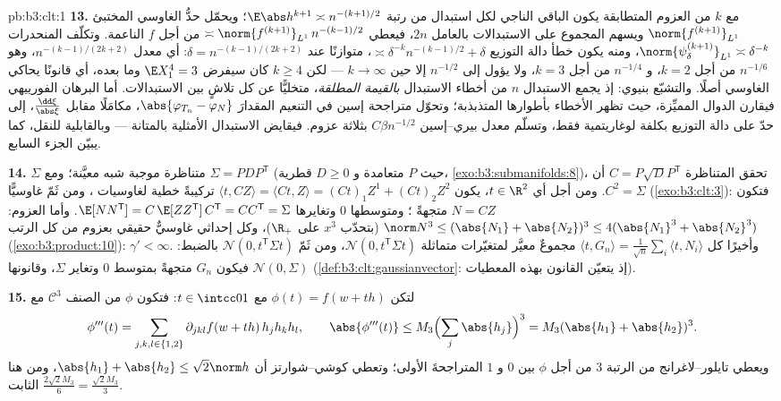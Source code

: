 \begin{solution}{pb:b3:clt:1}
\textbf{13.} مع $k$ من العزوم المتطابقة يكون الباقي الناجي لكل
استبدال من رتبة $\E\abs h^{k+1} \asymp
n^{-(k+1)/2}$؛ ويحمّل حدُّ الغاوسي المختبئ $\norm{f^{(k+1)}}_{L^1}$
ويسهم المجموع على الاستبدالات بالعامل $2n$، فيعطي $\asymp\norm{f^{(k+1)}}_{L^1}\,
n^{-(k-1)/2}$ من
أجل $f$ الناعمة. وتكلّف المنحدرات $\norm{\psi_\delta^{(k+1)}}_{L^1} \asymp \delta^{-k}$، ومنه يكون خطأ دالة
التوزيع $\asymp
\delta^{-k}n^{-(k-1)/2} + \delta$، متوازنًا عند $\delta =
n^{-(k-1)/(2k+2)}$: أي معدل $n^{-(k-1)/(2k+2)}$، وهو
$n^{-1/6}$ من أجل $k = 2$، و $n^{-1/4}$ من أجل $k = 3$، ولا
يؤول إلى $n^{-1/2}$ إلا حين $k \to \infty$ --- لكن
$k \geq 4$ كان سيفرض $\E X_1^4 = 3$ وما بعده، أي قانونًا يحاكي
الغاوسي أصلًا. والتشبّع بنيوي: إذ يجمع الاستبدال $n$ من أخطاء
الاستبدال \emph{بالقيمة المطلقة}، متخليًّا عن كل تلاشٍ بين
الاستبدالات. أما البرهان الفورييهي فيقارن الدوال المميِّزة، حيث
تظهر الأخطاء بأطوارها المتذبذبة؛ وتحوّل متراجحة إسين في التنعيم
المقدارَ $\abs{\varphi_{T_n}
- \varphi_N}$، مكامَلًا مقابل $\frac{\dd\xi}{\abs\xi}$، إلى حدّ على دالة
التوزيع بكلفة لوغاريتمية فقط، وتسلّم معدل بيري--إسين $C\beta n^{-1/2}$
بثلاثة عزوم. فيقايض الاستبدال الأمثلية بالمتانة --- وبالقابلية
للنقل، كما يبيّن الجزء السابع.

\textbf{14.} $\Sigma$ متناظرة موجبة شبه معيَّنة؛ ومع $\Sigma = PDP^{\mathsf T}$
(حيث $P$ متعامدة و $D \geq 0$ قطرية، \cref{exo:b3:submanifolds:8})، تحقق
المتناظرة $C =
P\sqrt DP^{\mathsf T}$ أن $C^2 = \Sigma$. ومن أجل أي $t
\in \R^2$، يكون
$\langle t, CZ\rangle = \langle Ct, Z\rangle =
(Ct)_1Z^1 + (Ct)_2Z^2$ تركيبةً خطية لغاوسيات ، ومن ثَمّ غاوسيًّا
(\cref{exo:b3:clt:3}): فتكون $N = CZ$ متجهةً ؛ ومتوسطها $0$
وتغايرها $\E[NN^{\mathsf T}] =
C\,\E[ZZ^{\mathsf T}]\,C^{\mathsf T} = CC^{\mathsf T} =
\Sigma$. وأما العزوم: $\norm N^3 \leq (\abs{N_1} +
\abs{N_2})^3 \leq 4(\abs{N_1}^3 + \abs{N_2}^3)$ (بتحدّب $x^3$ على
$\R_+$)، وكل إحداثي غاوسيٌّ حقيقي بعزوم من كل الرتب
(\cref{exo:b3:product:10}): $\gamma' < \infty$. وأخيرًا كل $\langle t, G_n\rangle = \frac1{\sqrt
n}\sum_i\langle t, N_i\rangle$ مجموعٌ معيَّر
لمتغيّرات  متماثلة $\mathcal N(0, t^{\mathsf T}\Sigma t)$، ومن ثَمّ $\mathcal N(0, t^{\mathsf T}\Sigma t)$ بالضبط:
فيكون $G_n$ متجهةً  بمتوسط $0$ وتغاير $\Sigma$، وقانونها
$\mathcal N(0, \Sigma)$ (\cref{def:b3:clt:gaussianvector}: إذ يتعيّن القانون بهذه المعطيات).

\textbf{15.} لتكن $\phi(t) = f(w + th)$ مع $t \in \intcc01$: فتكون $\phi$ من
الصنف $\mathcal C^3$ مع
\[
\phi'''(t) = \sum_{j,k,l\in\{1,2\}}\partial_{jkl}f(w +
th)\,h_jh_kh_l, \qquad \abs{\phi'''(t)} \leq
M_3\Bigl(\sum_j\abs{h_j}\Bigr)^3 = M_3(\abs{h_1} +
\abs{h_2})^3 .
\]
ويعطي تايلور--لاغرانج من الرتبة $3$ من أجل $\phi$ بين $0$
و $1$ المتراجحةَ الأولى؛ وتعطي كوشي--شوارتز أن $\abs{h_1} + \abs{h_2} \leq \sqrt2\norm h$، ومن هنا
الثابت $\frac{2\sqrt2M_3}6 = \frac{\sqrt2M_3}3$.


\end{solution}
